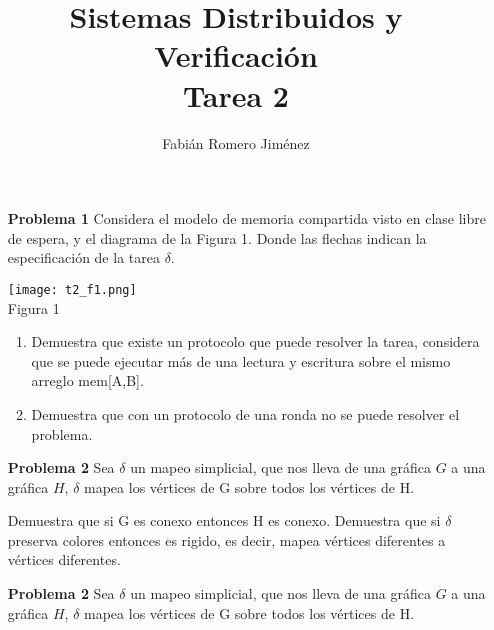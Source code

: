 \documentclass{article}
\title{Sistemas Distribuidos y Verificación \\ Tarea 2}
\author{Fabián Romero Jiménez}
\begin{document}
\maketitle

\begin{enumerate}

\item[\bf{Problema 1}] Considera el modelo de memoria compartida visto en clase libre de espera, y el diagrama de la Figura 1. Donde las flechas indican la especificación de la tarea $\delta$.\\

\begin{center}
  \texttt{[image: t2\_f1.png]}\\
  Figura 1
\end{center}

\begin{enumerate}

\item Demuestra que existe un protocolo que puede resolver la tarea, considera que se puede ejecutar más de una lectura y escritura sobre el mismo arreglo mem[A,B].

\item Demuestra que con un protocolo de una ronda no se puede resolver
el problema.

\end{enumerate}

\item[\bf{Problema 2}] Sea $\delta$ un mapeo simplicial, que nos lleva de una gráfica $G$ a una gráfica $H$, $\delta$ mapea los vértices de G sobre todos los vértices de H.

Demuestra que si G es conexo entonces H es conexo.
Demuestra que si $\delta$ preserva colores entonces es rigido, es decir, mapea
vértices diferentes a vértices diferentes.

\item[\bf{Problema 2}] Sea $\delta$ un mapeo simplicial, que nos lleva de una gráfica $G$ a una gráfica $H$, $\delta$ mapea los vértices de G sobre todos los vértices de H.

\end{enumerate}
\end{document}

